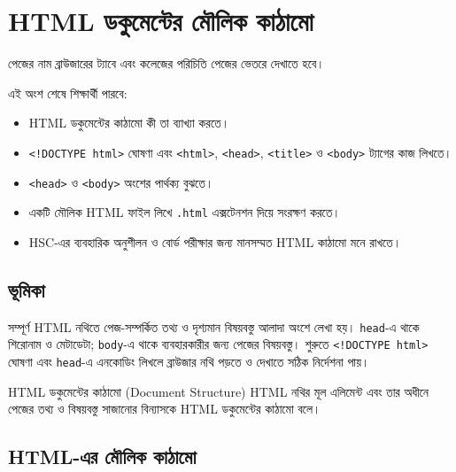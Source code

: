 \section{HTML ডকুমেন্টের মৌলিক কাঠামো}

পেজের নাম ব্রাউজারের ট্যাবে এবং কলেজের পরিচিতি পেজের ভেতরে দেখাতে হবে।



\begin{learningbox}
এই অংশ শেষে শিক্ষার্থী পারবে:
\begin{itemize}
\item HTML ডকুমেন্টের কাঠামো কী তা ব্যাখ্যা করতে।
\item \texttt{<!DOCTYPE html>} ঘোষণা এবং \texttt{<html>}, \texttt{<head>}, \texttt{<title>} ও \texttt{<body>} ট্যাগের কাজ লিখতে।
\item \texttt{<head>} ও \texttt{<body>} অংশের পার্থক্য বুঝতে।
\item একটি মৌলিক HTML ফাইল লিখে \texttt{.html} এক্সটেনশন দিয়ে সংরক্ষণ করতে।
\item HSC-এর ব্যবহারিক অনুশীলন ও বোর্ড পরীক্ষার জন্য মানসম্মত HTML কাঠামো মনে রাখতে।
\end{itemize}
\end{learningbox}

\subsection{ভূমিকা}
সম্পূর্ণ HTML নথিতে পেজ-সম্পর্কিত তথ্য ও দৃশ্যমান বিষয়বস্তু আলাদা অংশে লেখা হয়। \texttt{head}-এ থাকে শিরোনাম ও মেটাডেটা; \texttt{body}-এ থাকে ব্যবহারকারীর জন্য পেজের বিষয়বস্তু। শুরুতে \texttt{<!DOCTYPE html>} ঘোষণা এবং \texttt{head}-এ এনকোডিং লিখলে ব্রাউজার নথি পড়তে ও দেখাতে সঠিক নির্দেশনা পায়।

\begin{definitionbox}{HTML ডকুমেন্টের কাঠামো (Document Structure)}
HTML নথির মূল এলিমেন্ট এবং তার অধীনে পেজের তথ্য ও বিষয়বস্তু সাজানোর বিন্যাসকে HTML ডকুমেন্টের কাঠামো বলে।
\end{definitionbox}

\subsection{HTML-এর মৌলিক কাঠামো}

